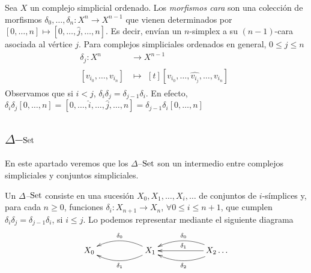 \documentclass[../main.tex]{subfiles}
\begin{document}
\begin{defi}
    Sea $X$ un complejo simplicial ordenado. Los \emph{morfismos cara} son una colecci\'on de morfismos $\delta_0,\dots,\delta_n\colon X^n\to X^{n-1}$ que vienen determinados por $[0,\dots,n] \mapsto [0,\dots,\hat{j},\dots,n]$. Es decir, env\'ian un $n$-simplex a su $(n-1)$-cara asociada al v\'ertice $j$.
    Para complejos simpliciales ordenados en general, $0\le j \le n$
    \begin{align*}
        \delta_j: X^n           & \longrightarrow X^{n-1} \\
        [v_{i_0},\dots,v_{i_n}] & \longmapsto\!
        \begin{aligned}[t]
            [v_{i_0},\dots,\hat{v_{i_j}},\dots,v_{i_n}]
        \end{aligned}
    \end{align*}
    Observamos que si $i<j$, $\delta_i\delta_j = \delta_{j-1}\delta_{i}$. En efecto, $\delta_i\delta_j[0,\dots,n] = [0,\dots,\hat{i},\dots,\hat{j},\dots,n] = \delta_{j-1}\delta_{i}[0,\dots,n]$
\end{defi}


\subsection{$\Delta$--$\mathop{\rm Set}$}
En este apartado veremos que los $\Delta$--$\mathop{\rm Set}$ son un intermedio entre complejos simpliciales y conjuntos simpliciales.
\begin{defi}
    Un \emph{$\Delta$--$\mathop{\rm Set}$} consiste en una sucesi\'on  $X_0,X_1,\dots,X_i,\dots$ de conjuntos de $i$-s\'implices y, para cada $n\ge 0$, funciones $\delta_i: X_{n+1} \to X_n$, $\forall 0\le i \le n+1$, que cumplen $\delta_i\delta_j = \delta_{j-1}\delta_{i}$, si $i\le j$.
    Lo podemos representar mediante el siguiente diagrama
    $$
        \xymatrix{
        X_0  & & X_1  \ar@/{}_{1pc}/[ll]_{\delta_0} \ar@/{}^{1pc}/[ll]^{\delta_1} & & X_2 \ar@/{}_{1pc}/[ll]_{\delta_0} \ar@/{}^{1pc}/[ll]^{\delta_2} \ar[ll]_{\delta_1} \dots
        }
    $$
\end{defi}

\newpage
\end{document}
